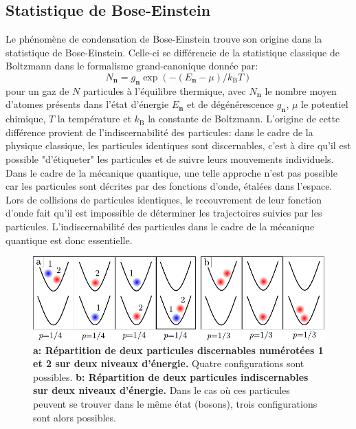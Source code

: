 \subsection{Statistique de Bose-Einstein}
Le phénomène de condensation de Bose-Einstein trouve son origine dans la statistique de Bose-Einstein. Celle-ci se différencie de la statistique classique de Boltzmann dans le formalisme grand-canonique donnée par:
\begin{equation}
N_{\mathbf{n}}=g_{\mathbf{n}} \exp{\left( -(E_{\mathbf{n}}-\mu)/k_{\mathrm{B}}T \right)}
\end{equation}
pour un gaz de $N$ particules à l'équilibre thermique, avec $N_{\mathbf{n}}$ le nombre moyen d'atomes présents dans l'état d'énergie $E_{\mathbf{n}}$ et de dégénérescence $g_{\mathbf{n}}$, $\mu$ le potentiel chimique, $T$ la température et $k_{\mathrm{B}}$ la constante de Boltzmann. L'origine de cette différence provient de l'indiscernabilité des particules: dans le cadre de la physique classique, les particules identiques sont discernables, c'est à dire qu'il est possible "d'étiqueter" les particules et de suivre leurs mouvements individuels.
Dans le cadre de la mécanique quantique, une telle approche n'est pas possible car les particules sont décrites par des fonctions d'onde, étalées dans l'espace. Lors de collisions de particules identiques, le recouvrement de leur fonction d'onde fait qu'il est impossible de déterminer les trajectoires suivies par les particules. L'indiscernabilité des particules dans le cadre de la mécanique quantique est donc essentielle.

\begin{figure}
\centering
\includegraphics[width=\textwidth]{Fig/BEC_manip/stat_bose.pdf}
\caption{\textbf{a: Répartition de deux particules discernables numérotées 1 et 2 sur deux niveaux d'énergie.} Quatre configurations sont possibles. \textbf{b: Répartition de deux particules indiscernables sur deux niveaux d'énergie.} Dans le cas où ces particules peuvent se trouver dans le même état (bosons), trois configurations sont alors possibles.}
\label{fig:stat_bose}
\end{figure}

